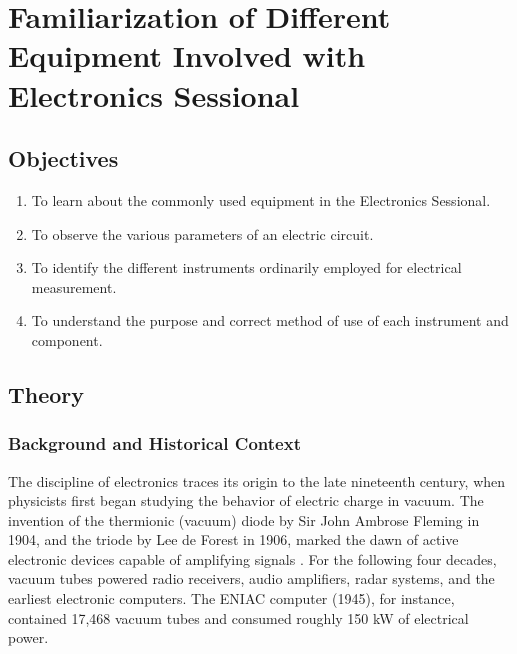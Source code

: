 \documentclass[12pt, a4paper, twoside]{report}
\begin{document}

\setcounter{page}{1}
\chapter{Familiarization of Different Equipment Involved with Electronics Sessional}

\section{Objectives}

\begin{enumerate}
  \item To learn about the commonly used equipment in the Electronics Sessional.
  \item To observe the various parameters of an electric circuit.
  \item To identify the different instruments ordinarily employed for electrical measurement.
  \item To understand the purpose and correct method of use of each instrument and component.
\end{enumerate}

\section{Theory}

\subsection*{Background and Historical Context}

The discipline of electronics traces its origin to the late nineteenth century, when
physicists first began studying the behavior of electric charge in vacuum. The invention
of the thermionic (vacuum) diode by Sir John Ambrose Fleming in 1904, and the triode by
Lee de Forest in 1906, marked the dawn of active electronic devices capable of amplifying
signals \cite{horowitz2015}. For the following four decades, vacuum tubes powered radio
receivers, audio amplifiers, radar systems, and the earliest electronic computers. The
ENIAC computer (1945), for instance, contained 17{,}468 vacuum tubes and consumed roughly
150 kW of electrical power.
\end{document}
